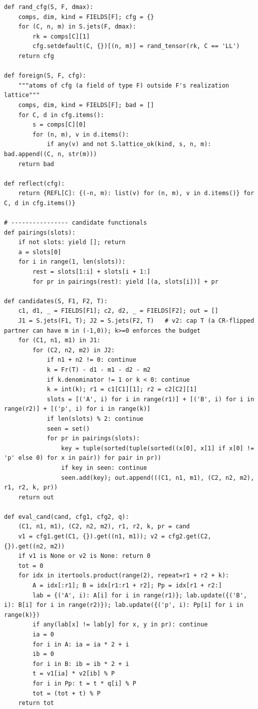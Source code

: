 \documentclass[10pt]{article}
\begin{document}
\begin{lstlisting}
def rand_cfg(S, F, dmax):
    comps, dim, kind = FIELDS[F]; cfg = {}
    for (C, n, m) in S.jets(F, dmax):
        rk = comps[C][1]
        cfg.setdefault(C, {})[(n, m)] = rand_tensor(rk, C == 'LL')
    return cfg

def foreign(S, F, cfg):
    """atoms of cfg (a field of type F) outside F's realization lattice"""
    comps, dim, kind = FIELDS[F]; bad = []
    for C, d in cfg.items():
        s = comps[C][0]
        for (n, m), v in d.items():
            if any(v) and not S.lattice_ok(kind, s, n, m): bad.append((C, n, str(m)))
    return bad

def reflect(cfg):
    return {REFL[C]: {(-n, m): list(v) for (n, m), v in d.items()} for C, d in cfg.items()}

# ---------------- candidate functionals
def pairings(slots):
    if not slots: yield []; return
    a = slots[0]
    for i in range(1, len(slots)):
        rest = slots[1:i] + slots[i + 1:]
        for pr in pairings(rest): yield [(a, slots[i])] + pr

def candidates(S, F1, F2, T):
    c1, d1, _ = FIELDS[F1]; c2, d2, _ = FIELDS[F2]; out = []
    J1 = S.jets(F1, T); J2 = S.jets(F2, T)   # v2: cap T (a CR-flipped partner can have m in (-1,0)); k>=0 enforces the budget
    for (C1, n1, m1) in J1:
        for (C2, n2, m2) in J2:
            if n1 + n2 != 0: continue
            k = Fr(T) - d1 - m1 - d2 - m2
            if k.denominator != 1 or k < 0: continue
            k = int(k); r1 = c1[C1][1]; r2 = c2[C2][1]
            slots = [('A', i) for i in range(r1)] + [('B', i) for i in range(r2)] + [('p', i) for i in range(k)]
            if len(slots) % 2: continue
            seen = set()
            for pr in pairings(slots):
                key = tuple(sorted(tuple(sorted((x[0], x[1] if x[0] != 'p' else 0) for x in pair)) for pair in pr))
                if key in seen: continue
                seen.add(key); out.append(((C1, n1, m1), (C2, n2, m2), r1, r2, k, pr))
    return out

def eval_cand(cand, cfg1, cfg2, q):
    (C1, n1, m1), (C2, n2, m2), r1, r2, k, pr = cand
    v1 = cfg1.get(C1, {}).get((n1, m1)); v2 = cfg2.get(C2, {}).get((n2, m2))
    if v1 is None or v2 is None: return 0
    tot = 0
    for idx in itertools.product(range(2), repeat=r1 + r2 + k):
        A = idx[:r1]; B = idx[r1:r1 + r2]; Pp = idx[r1 + r2:]
        lab = {('A', i): A[i] for i in range(r1)}; lab.update({('B', i): B[i] for i in range(r2)}); lab.update({('p', i): Pp[i] for i in range(k)})
        if any(lab[x] != lab[y] for x, y in pr): continue
        ia = 0
        for i in A: ia = ia * 2 + i
        ib = 0
        for i in B: ib = ib * 2 + i
        t = v1[ia] * v2[ib] % P
        for i in Pp: t = t * q[i] % P
        tot = (tot + t) % P
    return tot


\end{lstlisting}
\end{document}
